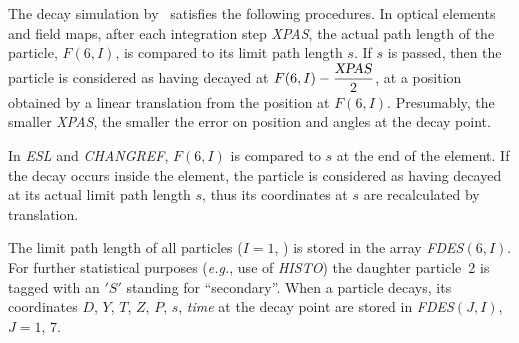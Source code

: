 {\bigskip

\noindent The decay simulation by \zgou\  satisfies  the following procedures.
In optical elements and field maps, after each integration step \textsl{XPAS}, the actual 
path length of the particle, $ F(6,I) $, is compared to its limit path length $ s$. 
 If $s $ is passed, then the particle is considered as having decayed at 
 $ F(6,I) - \dfrac{\text{\textsl{XPAS}} }{ 2} $, 
at a position obtained by a linear translation from the position at $ F(6,I)$.
Presumably, the smaller \textsl{XPAS},  the smaller the error on position
and angles at the decay point.  

\bigskip
\begin{figure}[H]
{\setlength{\captionwidth}{15cm}
       }
\end{figure}

\noindent In   \textsl{ESL}   and  \textsl{CHANGREF},  
$ F(6,I) $ is compared to $ s $ at the
end of the element. If the decay occurs inside the element, the particle is considered as having 
decayed at its actual limit path length $ s$,  thus its coordinates 
at $ s $ are recalculated by translation.  
\bigskip

\noindent The limit path length of all particles  ($I=1$, \IMAX{})   is stored in
the array  \textsl{FDES}$(6,I)$.  
For further statistical purposes
(\emph{e.g.}, use of \textsl{HISTO}) the daughter  particle~2    
is tagged with an $ 'S' $ standing for ``secondary''. When a particle decays, 
its coordinates $ D$, $Y$, $T$, $Z$, $P $, $s$, \textsl{time} at the decay point are stored in  
\textsl{FDES}$(J,I)$, \mbox{$ J=1,\, 7$}.  
\bigskip

}
